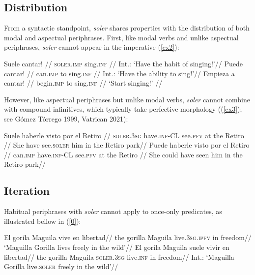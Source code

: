 \documentclass{cascadilla-xelatex-biblatex}
\begin{document}
	\subsection{Distribution}
	
	From a syntactic standpoint, \textit{soler} shares properties with the distribution of both modal and aspectual periphrases. First, like modal verbs and unlike aspectual periphrases, \textit{soler}  cannot appear in the imperative (\ref{ex2}):
	
	\pex\label{ex2}
	\a\begingl
	\gla\ljudge{*}Suele cantar! //
	\glb \textsc{soler.imp} sing.\textsc{inf} //
	\glft Int.: `Have the habit of singing!'//
	\endgl
	\a\begingl
	\gla\ljudge{*}Puede cantar! //
	\glb can.\textsc{imp} to sing.\textsc{inf} //
	\glft Int.: `Have the ability to sing!'//
	\endgl
	\a\begingl
	\gla Empieza a cantar! //
	\glb begin.\textsc{imp} to sing.\textsc{inf} //
	\glft `Start singing!' //
	\endgl
	\xe
	
	However, like aspectual periphrases but unlike modal verbs, \textit{soler} cannot combine with compound infinitives, which typically take perfective morphology ((\ref{ex3}); see G{\'o}mez T{\'o}rrego 1999, Vatrican 2021):
	
	
	\pex\label{ex3}
	\a\begingl
	\gla\ljudge{*}Suele haberle visto por el Retiro //
	\glb \textsc{soler.3sg} have.\textsc{inf-CL} see.\textsc{pfv} at the Retiro //
	\glft She have see.\textsc{soler} him in the Retiro park//
	\endgl
	\a\begingl
	\gla Puede haberle visto por el Retiro //
	\glb can.\textsc{imp} have.\textsc{inf-CL} see.\textsc{pfv} at the Retiro //
	\glft She could have seen him in the Retiro park//
	\endgl
	\xe
	
	\vspace{-\baselineskip}
	
	\subsection{Iteration}\label{iteration}
	
	Habitual periphrases with \textit{soler} cannot apply to once-only predicates, as illustrated bellow in (\ref{0}):
	
	\pex\label{0}
	\a\begingl
	\gla El gorila Maguila vive en libertad//
	\glb the gorilla Maguila live.\textsc{3sg.ipfv} in freedom//
	\glft `Maguilla Gorilla lives freely in the wild'//
	\endgl
	\a\begingl
	\gla\ljudge{*}El gorila Maguila suele vivir en libertad//
	\glb the gorilla Maguila \textsc{soler.3sg} live.\textsc{inf} {} in freedom//
	\glft Int.: `Maguilla Gorilla live.\textsc{soler} freely in the wild'//
	\endgl
	\xe
	
\end{document}
